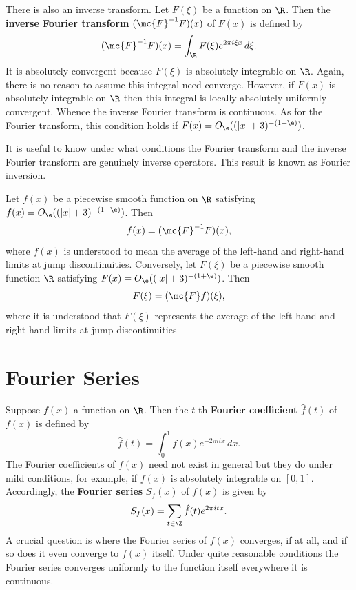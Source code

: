     There is also an inverse transform. Let \(F(\xi)\) be a function on \(\R\). Then the \textbf{inverse Fourier transform} \((\mc{F}^{-1}F)(x)\) of \(F(x)\) is defined by
    \[
      (\mc{F}^{-1}F)(x) = \int_{\R}F(\xi)e^{2\pi i\xi x}\,d\xi.
    \]
    It is absolutely convergent because \(F(\xi)\) is absolutely integrable on \(\R\). Again, there is no reason to assume this integral need converge. However, if \(F(x)\) is absolutely integrable on \(\R\) then this integral is locally absolutely uniformly convergent. Whence the inverse Fourier transform is continuous. As for the Fourier transform, this condition holds if \(F(x) = O_{\e}((|x|+3)^{-(1+\e)})\).

    It is useful to know under what conditions the Fourier transform and the inverse Fourier transform are genuinely inverse operators. This result is known as Fourier inversion.

    \begin{theorem*}
      Let \(f(x)\) be a piecewise smooth function on \(\R\) satisfying \(f(x) = O_{\e}((|x|+3)^{-(1+\e)})\). Then
      \[
        f(x) = (\mc{F}^{-1}F)(x),
      \]
      where \(f(x)\) is understood to mean the average of the left-hand and right-hand limits at jump discontinuities. Conversely, let \(F(\xi)\) be a piecewise smooth function \(\R\) satisfying \(F(x) = O_{\e}((|x|+3)^{-(1+\e)})\). Then
      \[
        F(\xi) = (\mc{F}f)(\xi),
      \]
      where it is understood that \(F(\xi)\) represents the average of the left-hand and right-hand limits at jump discontinuities
    \end{theorem*}
  \section{Fourier Series}\label{sec:Fourier_series}
    Suppose \(f(x)\) a function on \(\R\). Then the \(t\)-th \textbf{Fourier coefficient} \(\hat{f}(t)\) of \(f(x)\) is defined by
    \[
      \hat{f}(t) = \int_{0}^{1}f(x)e^{-2\pi itx}\,dx.
    \]
    The Fourier coefficients of \(f(x)\) need not exist in general but they do under mild conditions, for example, if \(f(x)\) is absolutely integrable on \([0,1]\). Accordingly, the \textbf{Fourier series} \(S_{f}(x)\) of \(f(x)\) is given by
    \[
      S_{f}(x) = \sum_{t \in \Z}\hat{f}(t)e^{2\pi itx}.
    \]
    A crucial question is where the Fourier series of \(f(x)\) converges, if at all, and if so does it even converge to \(f(x)\) itself. Under quite reasonable conditions the Fourier series converges uniformly to the function itself everywhere it is continuous.

